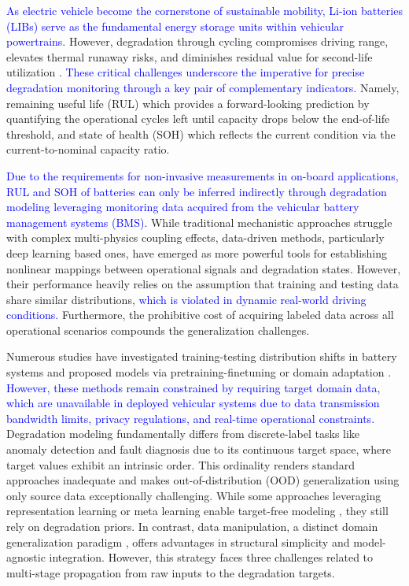 \documentclass[lettersize,journal]{IEEEtran}
\newcommand{\rev}[1]{\textcolor{blue}{#1}}
\begin{document}
\rev{As electric vehicle become the cornerstone of sustainable mobility, Li-ion batteries (LIBs) serve as the fundamental energy storage units within vehicular powertrains\cite{10766661, 9849057, 10897846, WASEEM2025236414}.} However, degradation through cycling compromises driving range, elevates thermal runaway risks, and diminishes residual value for second-life utilization \cite{LI2024155588}.
\rev{These critical challenges underscore the imperative for precise degradation monitoring through a key pair of complementary indicators.} Namely, remaining useful life (RUL) which provides a forward-looking prediction by quantifying the operational cycles left until capacity drops below the end-of-life threshold, and state of health (SOH) which reflects the current condition via the current-to-nominal capacity ratio.

\rev{Due to the requirements for non-invasive measurements in on-board applications, RUL and SOH of batteries can only be inferred indirectly through degradation modeling leveraging monitoring data acquired from the vehicular battery management systems (BMS).}
% 
While traditional mechanistic approaches struggle with complex multi-physics coupling effects, data-driven methods, particularly deep learning based ones, have emerged as more powerful tools for establishing nonlinear mappings between operational signals and degradation states\cite{XIAO2023107347, XIE2024630}.
However, their performance heavily relies on the assumption that training and testing data share similar distributions, \rev{which is violated in dynamic real-world driving conditions.} Furthermore, the prohibitive cost of acquiring labeled data across all operational scenarios compounds the generalization challenges.

Numerous studies have investigated training-testing distribution shifts in battery systems and proposed models via pretraining-finetuning or domain adaptation \cite{10177255}. \rev{However, these methods remain constrained by requiring target domain data, which are unavailable in deployed vehicular systems due to data transmission bandwidth limits, privacy regulations, and real-time operational constraints\cite{10886998, 10663939, 9849057}.}
% 
Degradation modeling fundamentally differs from discrete-label tasks like anomaly detection and fault diagnosis \cite{10214203, 10577994} due to its continuous target space, where target values exhibit an intrinsic order. This ordinality renders standard approaches inadequate and makes out-of-distribution (OOD) generalization using only source data exceptionally challenging.
%
While some approaches leveraging representation learning or meta learning enable target-free modeling \cite{TAN2024103725, CHEN2024234696}, they still rely on degradation priors. In contrast, data manipulation, a distinct domain generalization paradigm \cite{9782500}, offers advantages in structural simplicity and model-agnostic integration. However, this strategy faces three challenges related to multi-stage propagation from raw inputs to the degradation targets.
\end{document}
